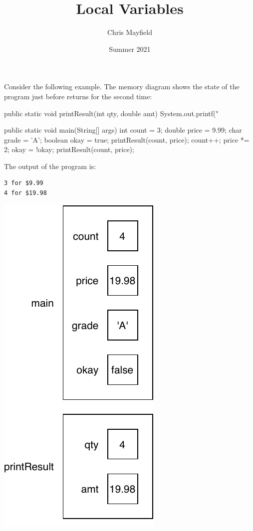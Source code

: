 \documentclass[12pt]{article}
\title{Local Variables}
\author{Chris Mayfield}
\date{Summer 2021}
\begin{document}
\maketitle


Consider the following example.
The memory diagram shows the state of the program just before  returns for the second time:

\medskip
\begin{javalst}
public static void printResult(int qty, double amt) {
    System.out.printf("%
}

public static void main(String[] args) {
    int count = 3;
    double price = 9.99;
    char grade = 'A';
    boolean okay = true;
    printResult(count, price);
    count++;
    price *= 2;
    okay = !okay;
    printResult(count, price);
}
\end{javalst}

\bigskip
The output of the program is:

\begin{verbatim}
3 for $9.99
4 for $19.98
\end{verbatim}

\vspace{-26em}
\hfill \includegraphics{local-diagram.pdf}
\hspace{2em} \null
\end{document}
